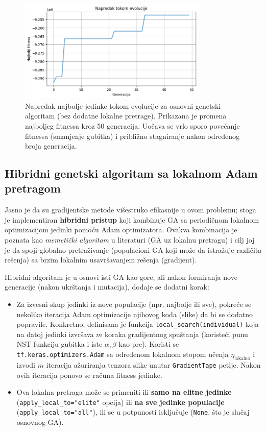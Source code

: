 \documentclass[a4paper,12pt]{article}
\begin{document}
\begin{figure}[h]
\centering
\includegraphics[width=0.8\textwidth]{fitness_curve_none.png}
\caption{Napredak najbolje jedinke tokom evolucije za osnovni genetski algoritam (bez dodatne lokalne pretrage). Prikazana je promena najboljeg fitnessa kroz 50 generacija. Uočava se vrlo sporo povećanje fitnessa (smanjenje gubitka) i približno stagniranje nakon određenog broja generacija.}
\end{figure}


\subsection{Hibridni genetski algoritam sa lokalnom Adam pretragom}
Jasno je da su gradijentske metode višestruko efikasnije u ovom problemu; stoga je implementiran \textbf{hibridni pristup} koji kombinuje GA sa periodičnom lokalnom optimizacijom jedinki pomoću Adam optimizatora. Ovakva kombinacija je poznata kao \emph{memetički algoritam} u literaturi (GA uz lokalnu pretragu) i cilj joj je da spoji globalno pretraživanje (populacioni GA koji može da istražuje različita rešenja) sa brzim lokalnim usavršavanjem rešenja (gradijent).

Hibridni algoritam je u osnovi isti GA kao gore, ali nakon formiranja nove generacije (nakon ukrštanja i mutacija), dodaje se dodatni korak:
\begin{itemize}
\item Za izvesni skup jedinki iz nove populacije (npr. najbolje ili sve), pokreće se nekoliko iteracija Adam optimizacije njihovog koda (slike) da bi se dodatno popravile. Konkretno, definisana je funkcija \texttt{local\_search(individual)} koja na datoj jedinki izvršava $m$ koraka gradijentnog spuštanja (koristeći punu NST funkciju gubitka i iste $\alpha, \beta$ kao pre). Koristi se \texttt{tf.keras.optimizers.Adam} sa određenom lokalnom stopom učenja $\eta_{\text{lokalno}}$ i izvodi $m$ iteracija ažuriranja tenzora slike unutar \texttt{GradientTape} petlje. Nakon ovih iteracija ponovo se računa fitness jedinke.
\item Ova lokalna pretraga može se primeniti ili \textbf{samo na elitne jedinke} (\texttt{apply\_local\_to="elite"} opcija) ili \textbf{na sve jedinke populacije} (\texttt{apply\_local\_to="all"}), ili se u potpunosti isključuje (\texttt{None}, što je slučaj osnovnog GA).
\end{itemize}
\end{document}
